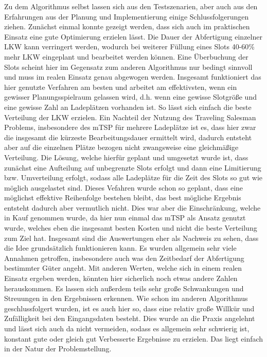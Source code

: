 Zu dem Algorithmus selbst lassen sich aus den Testszenarien, aber auch aus den Erfahrungen aus der Planung und Implementierung einige Schlussfolgerungen ziehen. Zunächst einmal konnte gezeigt werden, dass sich auch im praktischen Einsatz eine gute Optimierung erzielen lässt. Die Dauer der Abfertigung einzelner LKW kann verringert werden, wodurch bei weiterer Füllung eines Slots 40-60\% mehr LKW eingeplant und bearbeitet werden können. Eine Überbuchung der Slots scheint hier im Gegensatz zum anderen Algorithmus nur bedingt sinnvoll und muss im realen Einsatz genau abgewogen werden. Insgesamt funktioniert das hier genutzte Verfahren am besten und arbeitet am effektivsten, wenn ein gewisser Planungsspielraum gelassen wird, d.h. wenn eine gewisse Slotgröße und eine gewisse Zahl an Ladeplätzen vorhanden ist. So lässt sich einfach die beste Verteilung der LKW erzielen. Ein Nachteil der Nutzung des Traveling Salesman Problems, insbesondere des mTSP für mehrere Ladeplätze ist es, dass hier zwar die insgesamt die kürzeste Bearbeitungsdauer ermittelt wird, dadurch entsteht aber auf die einzelnen Plätze bezogen nicht zwangsweise eine gleichmäßige Verteilung. Die Lösung, welche hierfür geplant und umgesetzt wurde ist, dass zunächst eine Aufteilung auf unbegrenzte Slots erfolgt und dann eine Limitierung bzw. Umverteilung erfolgt, sodass alle Ladeplätze für die Zeit des Slots so gut wie möglich ausgelastet sind. Dieses Vefahren wurde schon so geplant, dass eine möglichst effektive Reihenfolge bestehen bleibt, das best mögliche Ergebnis entsteht dadurch aber vermutlich nicht. Dies war aber die Einschränkung, welche in Kauf genommen wurde, da hier nun einmal das mTSP als Ansatz genutzt wurde, welches eben die insgesamt besten Kosten und nicht die beste Verteilung zum Ziel hat. Insgesamt sind die Auswertungen eher als Nachweis zu sehen, dass die Idee grundsätzlich funktionieren kann. Es wurden allgemein sehr viele Annahmen getroffen, insbesondere auch was den Zeitbedarf der Abfertigung bestimmter Güter angeht. Mit anderen Werten, welche sich in einem realen Einsatz ergeben werden, könnten hier sicherlich noch etwas andere Zahlen herauskommen. Es lassen sich außerdem teils sehr große Schwankungen und Streuungen in den Ergebnissen erkennen. Wie schon im anderen Algorithmus geschlussfolgert wurden, ist es auch hier so, dass eine relativ große Willkür und Zufälligkeit bei den Eingangsdaten besteht. Dies wurde an die Praxis angelehnt und lässt sich auch da nicht vermeiden, sodass es allgemein sehr schwierig ist, konstant gute oder gleich gut Verbesserte Ergebnisse zu erzielen. Das liegt einfach in der Natur der Problemstellung.

